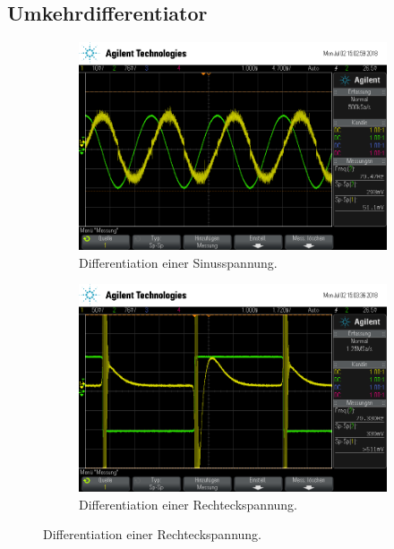 \subsection{Umkehrdifferentiator}
\begin{figure}[ht]
  \centering
  
  \caption{}
  \label{fig:dif}
\end{figure}
\begin{figure}[ht]
  \centering
  \begin{subfigure}[]{\textwidth}
    \centering
    \includegraphics[height=0.3\textheight]{data/scope_265.png}
    \caption{Differentiation einer Sinusspannung.}
    \label{subfig:dif_sinus}
  \end{subfigure}
  \begin{subfigure}[]{\textwidth}
    \centering
    \includegraphics[height=0.3\textheight]{data/scope_266.png}
    \caption{Differentiation einer Rechteckspannung.}

\end{subfigure}
\end{figure}
